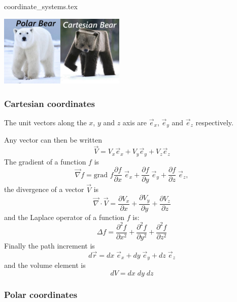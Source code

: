 \begin{flushright} {\tiny {\color{gray} coordinate\_systems.tex}} \end{flushright}

\begin{center}
\includegraphics[width=6cm]{images/polarbear}
\end{center}

\subsubsection{Cartesian coordinates}

The unit vectors along the $x$, $y$ and $z$ axis are 
$\vec{e}_x$, $\vec{e}_y$ and $\vec{e}_z$ respectively.



\noindent Any vector can then be written
\[
{\vec V}  = V_x {\vec e}_x  + V_y {\vec e}_y + V_z \vec{e}_z
\]
The gradient of a function $f$ is 
\[
\vec{\nabla} f= \text{grad }f 
\frac{\partial f}{\partial x}\; \vec{e}_x +
\frac{\partial f}{\partial y}\; \vec{e}_y +
\frac{\partial f}{\partial z}\; \vec{e}_z,
\]
the divergence of a vector $\vec{V}$ is
\[
\vec{\nabla}\cdot \vec{V} = 
\frac{\partial V_x}{\partial x}+
\frac{\partial V_y}{\partial y}+
\frac{\partial V_z}{\partial z}
\]
and the Laplace operator of a function $f$ is:
\[
\Delta f = 
\frac{\partial^2 f}{\partial x^2} + 
\frac{\partial^2 f}{\partial y^2} + 
\frac{\partial^2 f}{\partial z^2}  
\]
Finally the path increment is
\[
d\vec{r} = dx \; {\vec e}_x  + dy\; {\vec e}_y + dz \; \vec{e}_z
\]
and the volume element is 
\[
dV=dx\; dy \; dz
\]

\subsubsection{Polar coordinates}

